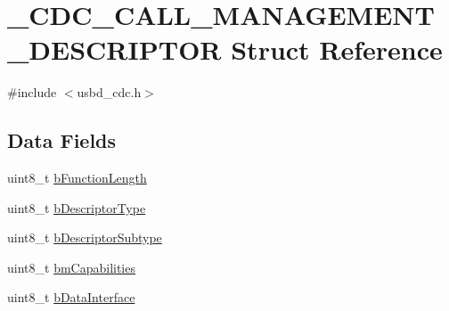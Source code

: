 \hypertarget{struct__CDC__CALL__MANAGEMENT__DESCRIPTOR}{\section{\-\_\-\-C\-D\-C\-\_\-\-C\-A\-L\-L\-\_\-\-M\-A\-N\-A\-G\-E\-M\-E\-N\-T\-\_\-\-D\-E\-S\-C\-R\-I\-P\-T\-O\-R Struct Reference}
\label{struct__CDC__CALL__MANAGEMENT__DESCRIPTOR}
}


{\ttfamily \#include $<$usbd\-\_\-cdc.\-h$>$}

\subsection*{Data Fields}
\begin{DoxyCompactItemize}
\item 
uint8\-\_\-t \hyperlink{struct__CDC__CALL__MANAGEMENT__DESCRIPTOR_a67c9d008203a3eca2b11bfaead2ee508}{b\-Function\-Length}
\item 
uint8\-\_\-t \hyperlink{struct__CDC__CALL__MANAGEMENT__DESCRIPTOR_ad0b4159e2168c9715af11ff5e74c2fd8}{b\-Descriptor\-Type}
\item 
uint8\-\_\-t \hyperlink{struct__CDC__CALL__MANAGEMENT__DESCRIPTOR_a3e1abaaf7e6ed4f46ad8cd52fd82d47a}{b\-Descriptor\-Subtype}
\item 
uint8\-\_\-t \hyperlink{struct__CDC__CALL__MANAGEMENT__DESCRIPTOR_ac915bf6e709a2cd06bd424a033c96a9b}{bm\-Capabilities}
\item 
uint8\-\_\-t \hyperlink{struct__CDC__CALL__MANAGEMENT__DESCRIPTOR_ac78c72c5ec7c4aeba89379c07041037a}{b\-Data\-Interface}
\end{DoxyCompactItemize}


